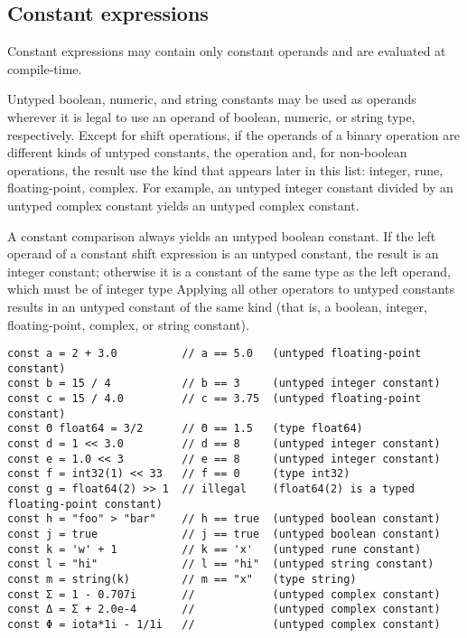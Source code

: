 \subsection*{Constant expressions}

Constant expressions may contain only constant
operands and are evaluated at compile-time.

Untyped boolean, numeric, and string constants may be used as operands
wherever it is legal to use an operand of boolean, numeric, or string
type, respectively. Except for shift operations, if the operands of a
binary operation are different kinds of untyped constants, the operation
and, for non-boolean operations, the result use the kind that appears
later in this list: integer, rune, floating-point, complex. For example,
an untyped integer constant divided by an untyped complex constant
yields an untyped complex constant.

A constant comparison always yields an untyped boolean constant.
If the left operand of a constant shift expression is an untyped
constant, the result is an integer constant; otherwise it is a
constant of the same type as the left operand, which must be of
integer type Applying all other operators to untyped constants
results in an untyped constant of the same kind (that is, a boolean,
integer, floating-point, complex, or string constant).

\begin{Verbatim}[frame=single]
const a = 2 + 3.0          // a == 5.0   (untyped floating-point constant)
const b = 15 / 4           // b == 3     (untyped integer constant)
const c = 15 / 4.0         // c == 3.75  (untyped floating-point constant)
const Θ float64 = 3/2      // Θ == 1.5   (type float64)
const d = 1 << 3.0         // d == 8     (untyped integer constant)
const e = 1.0 << 3         // e == 8     (untyped integer constant)
const f = int32(1) << 33   // f == 0     (type int32)
const g = float64(2) >> 1  // illegal    (float64(2) is a typed floating-point constant)
const h = "foo" > "bar"    // h == true  (untyped boolean constant)
const j = true             // j == true  (untyped boolean constant)
const k = 'w' + 1          // k == 'x'   (untyped rune constant)
const l = "hi"             // l == "hi"  (untyped string constant)
const m = string(k)        // m == "x"   (type string)
const Σ = 1 - 0.707i       //            (untyped complex constant)
const Δ = Σ + 2.0e-4       //            (untyped complex constant)
const Φ = iota*1i - 1/1i   //            (untyped complex constant)
\end{Verbatim}

